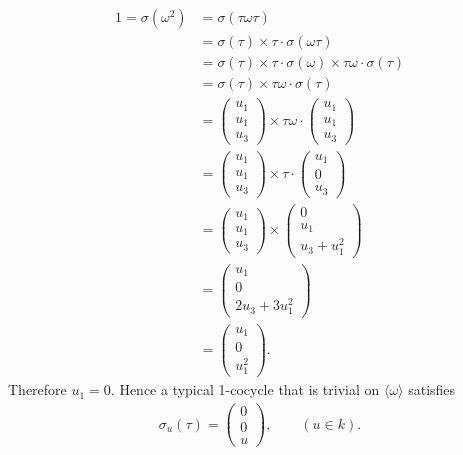\begin{align*}
	1 = \sigma(\omega^2) &= \sigma(\tau\omega\tau) \\
	&= \sigma(\tau) \times \tau\cdot\sigma(\omega\tau)\\
	&= \sigma(\tau) \times \tau\cdot\sigma(\omega) \times \tau\omega\cdot\sigma(\tau) \\
	&= \sigma(\tau) \times \tau\omega\cdot\sigma(\tau) \\
	&= \left(\begin{matrix} u_1 \\ u_1 \\ u_3\end{matrix} \right) \times
	\tau\omega\cdot\left(\begin{matrix} u_1 \\ u_1 \\ u_3\end{matrix} \right)\\
	&= \left(\begin{matrix} u_1 \\ u_1 \\ u_3\end{matrix} \right) \times
	\tau\cdot\left(\begin{matrix} u_1 \\ 0 \\ u_3\end{matrix} \right)\\
	&= \left(\begin{matrix} u_1 \\ u_1 \\ u_3\end{matrix} \right) \times
	\left(\begin{matrix} 0 \\ u_1 \\ u_3 + u_1^2\end{matrix} \right)\\
	&= \left(\begin{matrix} u_1 \\ 0 \\ 2u_3 + 3u_1^2\end{matrix} \right)\\
	&= \left(\begin{matrix} u_1 \\ 0 \\ u_1^2\end{matrix} \right).
\end{align*}
Therefore $u_1 = 0$. Hence a typical 1-cocycle that is trivial on $\langle \omega \rangle$ satisfies
\begin{align*}
	\sigma_u(\tau) = \left(\begin{matrix} 0 \\ 0 \\ u \end{matrix} \right),\qquad (u\in k).
\end{align*}

